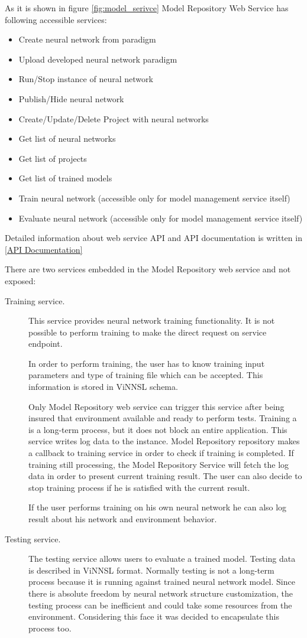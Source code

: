 As it is shown in figure \ref{fig:model_serivce} Model Repository Web Service has following accessible services:

\begin{itemize}
\item Create neural network from paradigm
\item Upload developed neural network paradigm
\item Run/Stop instance of neural network
\item Publish/Hide neural network 
\item Create/Update/Delete Project with neural networks
\item Get list of neural networks
\item Get list of projects
\item Get list of trained models 
\item Train neural network (accessible only for model management service itself)
\item Evaluate neural network (accessible only for model management service itself)
\end{itemize}

Detailed information about web service API and API documentation is written in \autoref{API Documentation}


There are two services embedded in the Model Repository web service and not exposed:

\begin{description}
\item[Training service.]  This service provides neural network training functionality. It is not possible to perform training to make the direct request on service endpoint. 

In order to perform training, the user has to know training input parameters and type of training file which can be accepted. This information is stored in ViNNSL schema. 
 
Only Model Repository web service can trigger this service after being insured that environment available and ready to perform tests. Training a is a long-term process, but it does not block an entire application. This service writes log data to the instance. Model Repository repository makes a callback to training service in order to check if training is completed. If training still processing, the Model Repository Service will fetch the log data in order to present current training result. The user can also decide to stop training process if he is satisfied with the current result.

If the user performs training on his own neural network he can also log result about his network and environment behavior. 
\item[Testing service.] The testing service allows users to evaluate a trained model.  Testing data is described in ViNNSL format. Normally testing is not a long-term process because it is running against trained neural network model. Since there is absolute freedom by neural network structure customization, the testing process can be inefficient and could take some resources from the environment. Considering this face it was decided to encapsulate this process too. 
\end{description}

